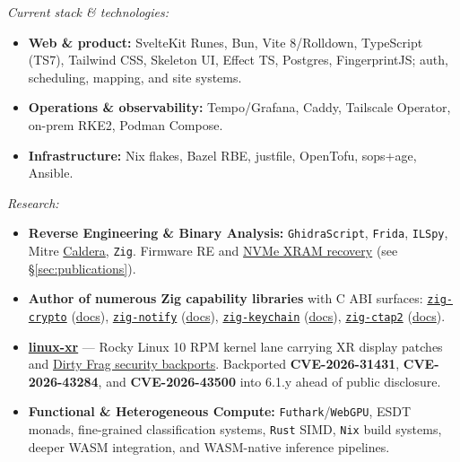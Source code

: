 \documentclass[10pt,letterpaper]{article}
\newcommand{\tech}[1]{\texttt{\small\color{secondary}#1}}
\newcommand{\cvlink}[2]{\href{#1}{\color{linkcolor}#2}}
\begin{document}
\vspace{0.4em}
\noindent\textit{\color{muted}Current stack \& technologies:}
\begin{itemize}
    \item \textbf{Web \& product:} SvelteKit Runes, Bun, Vite 8/Rolldown, TypeScript (TS7), Tailwind CSS, Skeleton UI, Effect TS, Postgres, FingerprintJS; auth, scheduling, mapping, and site systems.
    \item \textbf{Operations \& observability:} Tempo/Grafana, Caddy, Tailscale Operator, on-prem RKE2, Podman Compose.
    \item \textbf{Infrastructure:} Nix flakes, Bazel RBE, justfile, OpenTofu, sops+age, Ansible.
\end{itemize}

\vspace{0.3em}
\noindent\textit{\color{muted}Research:}
\begin{itemize}
    \item \textbf{Reverse Engineering \& Binary Analysis:} \tech{GhidraScript}, \tech{Frida}, \tech{ILSpy}, Mitre \cvlink{https://github.com/Jesssullivan/caldera}{Caldera}, \tech{Zig}. Firmware RE and \cvlink{https://github.com/Jesssullivan/hiberpower-ntfs/pull/1}{NVMe XRAM recovery} (see \S\ref{sec:publications}).
    \item \textbf{Author of numerous Zig capability libraries} with C ABI surfaces: \cvlink{https://github.com/Jesssullivan/zig-crypto}{\tech{zig-crypto}} (\cvlink{https://transscendsurvival.org/zig-crypto/}{docs}), \cvlink{https://github.com/Jesssullivan/zig-notify}{\tech{zig-notify}} (\cvlink{https://transscendsurvival.org/zig-notify/}{docs}), \cvlink{https://github.com/Jesssullivan/zig-keychain}{\tech{zig-keychain}} (\cvlink{https://transscendsurvival.org/zig-keychain/}{docs}), \cvlink{https://github.com/Jesssullivan/zig-ctap2}{\tech{zig-ctap2}} (\cvlink{https://transscendsurvival.org/zig-ctap2/}{docs}).
    \item \cvlink{https://github.com/tinyland-inc/linux-xr}{\textbf{linux-xr}} --- Rocky Linux 10 RPM kernel lane carrying XR display patches and \cvlink{https://github.com/tinyland-inc/linux-xr/pull/66}{Dirty Frag security backports}. Backported \textbf{CVE-2026-31431}, \textbf{CVE-2026-43284}, and \textbf{CVE-2026-43500} into 6.1.y ahead of public disclosure.
    \item \textbf{Functional \& Heterogeneous Compute:} \tech{Futhark}/\tech{WebGPU}, ESDT monads, fine-grained classification systems, \tech{Rust} SIMD, \tech{Nix} build systems, deeper WASM integration, and WASM-native inference pipelines.
\end{itemize}
\end{document}
